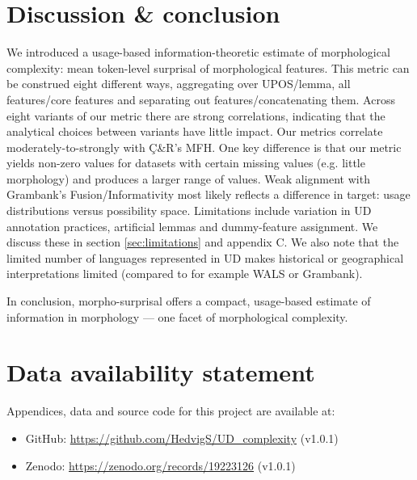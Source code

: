 \documentclass[USenglish]{article}
\begin{document}
\section{Discussion \& conclusion}\label{sec:discussion}
We introduced a usage-based information-theoretic estimate of morphological complexity: mean token-level surprisal of morphological features.
This metric can be construed eight different ways, aggregating over UPOS/lemma, all features/core features and separating out features/concatenating them.
Across eight variants of our metric there are strong correlations, indicating that the analytical choices between variants have little impact.
Our metrics correlate moderately-to-strongly with Ç\&R's MFH.
One key difference is that our metric yields non-zero values for datasets with certain missing values (e.g. little morphology) and produces a larger range of values.
Weak alignment with Grambank's Fusion/Informativity most likely reflects a difference in target: usage distributions versus possibility space.
Limitations include variation in UD annotation practices, artificial lemmas and dummy-feature assignment. 
We discuss these in section \ref{sec:limitations} and appendix C.
We also note that the limited number of languages represented in UD makes historical or geographical interpretations limited (compared to for example WALS or Grambank).

In conclusion, morpho-surprisal offers a compact, usage-based estimate of information in morphology --- one facet of morphological complexity. 


\section{Data availability statement}

Appendices, data and source code for this project are available at: 
\begin{itemize}
    \item GitHub: \href{https://github.com/HedvigS/UD_complexity}{https://github.com/HedvigS/UD\_complexity} (v1.0.1)
    \item Zenodo: \href{https://zenodo.org/records/19223126}{https://zenodo.org/records/19223126} (v1.0.1)
\end{itemize}
\end{document}

